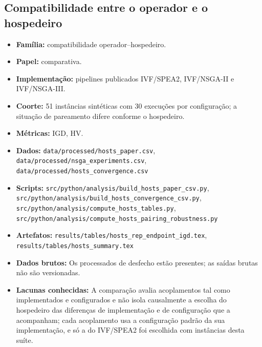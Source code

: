 \subsection*{Compatibilidade entre o operador e o hospedeiro}
\begin{itemize}[nosep]\raggedright
    \item \textbf{Família:} compatibilidade operador--hospedeiro.
    \item \textbf{Papel:} comparativa.
    \item \textbf{Implementação:} pipelines publicados IVF/SPEA2, IVF/NSGA-II e IVF/NSGA-III.
    \item \textbf{Coorte:} 51 instâncias sintéticas com 30 execuções por configuração; a situação de pareamento difere conforme o hospedeiro.
    \item \textbf{Métricas:} IGD, HV.
    \item \textbf{Dados:} \texttt{data/\allowbreak{}processed/\allowbreak{}hosts\_\allowbreak{}paper.csv}, \texttt{data/\allowbreak{}processed/\allowbreak{}nsga\_\allowbreak{}experiments.csv}, \texttt{data/\allowbreak{}processed/\allowbreak{}hosts\_\allowbreak{}convergence.csv}
    \item \textbf{Scripts:} \texttt{src/\allowbreak{}python/\allowbreak{}analysis/\allowbreak{}build\_\allowbreak{}hosts\_\allowbreak{}paper\_\allowbreak{}csv.py}, \texttt{src/\allowbreak{}python/\allowbreak{}analysis/\allowbreak{}build\_\allowbreak{}hosts\_\allowbreak{}convergence\_\allowbreak{}csv.py}, \texttt{src/\allowbreak{}python/\allowbreak{}analysis/\allowbreak{}compute\_\allowbreak{}hosts\_\allowbreak{}tables.py}, \texttt{src/\allowbreak{}python/\allowbreak{}analysis/\allowbreak{}compute\_\allowbreak{}hosts\_\allowbreak{}pairing\_\allowbreak{}robustness.py}
    \item \textbf{Artefatos:} \texttt{results/\allowbreak{}tables/\allowbreak{}hosts\_\allowbreak{}rep\_\allowbreak{}endpoint\_\allowbreak{}igd.tex}, \texttt{results/\allowbreak{}tables/\allowbreak{}hosts\_\allowbreak{}summary.tex}
    \item \textbf{Dados brutos:} Os processados de desfecho estão presentes; as saídas brutas não são versionadas.
    \item \textbf{Lacunas conhecidas:} A comparação avalia acoplamentos tal como implementados e configurados e não isola causalmente a escolha do hospedeiro das diferenças de implementação e de configuração que a acompanham; cada acoplamento usa a configuração padrão da sua implementação, e só a do IVF/SPEA2 foi escolhida com instâncias desta suíte.
\end{itemize}

